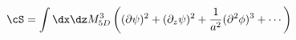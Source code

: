 \begin{equation}
\cS = \int \dx \dz M_{5D}^3
\left((\partial \psi)^2 + (\partial_z \psi)^2 
+ \frac{1}{a^2}(\partial^2 \phi)^3 + \cdots \right) \nonumber
\end{equation}


